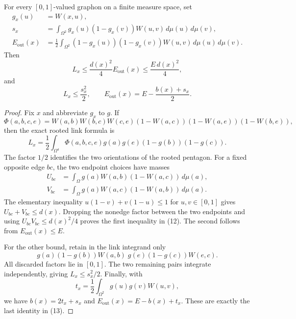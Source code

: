 \begin{lemma}\label{lem:universal-links}
For every \([0,1]\)-valued graphon on a finite measure space, set
\begin{align*}
 g_x(u)&=W(x,u),\\
 s_x&=\int_{\Omega^2}g_x(u)(1-g_x(v))W(u,v)\,d\mu(u)\,d\mu(v),\\
 E_{\mathrm{out}}(x)&=\frac12\int_{\Omega^2}
       (1-g_x(u))(1-g_x(v))W(u,v)\,d\mu(u)\,d\mu(v).
\end{align*}
Then
\begin{equation}
 L_x\le\frac{d(x)^2}{4}E_{\mathrm{out}}(x)
       \le\frac{E\,d(x)^2}{4},\tag{12}
\end{equation}
and
\begin{equation}
 L_x\le\frac{s_x^2}{2},\qquad
 E_{\mathrm{out}}(x)=E-\frac{b(x)+s_x}{2}.\tag{13}
\end{equation}
\end{lemma}
\begin{proof}
Fix \(x\) and abbreviate \(g_x\) to \(g\). If
\[
 \Phi(a,b,c,e)=W(a,b)W(b,c)W(c,e)
       (1-W(a,c))(1-W(a,e))(1-W(b,e)),
\]
then the exact rooted link formula is
\[
 L_x=\frac12\int_{\Omega^4}
       \Phi(a,b,c,e)g(a)g(e)(1-g(b))(1-g(c)).
\]
The factor \(1/2\) identifies the two orientations of the rooted pentagon.
For a fixed opposite edge \(bc\), the two endpoint choices have masses
\begin{align*}
 U_{bc}&=\int_\Omega g(a)W(a,b)(1-W(a,c))\,d\mu(a),\\
 V_{bc}&=\int_\Omega g(a)W(a,c)(1-W(a,b))\,d\mu(a).
\end{align*}
The elementary inequality \(u(1-v)+v(1-u)\le1\) for \(u,v\in[0,1]\)
gives \(U_{bc}+V_{bc}\le d(x)\). Dropping the nonedge factor between
the two endpoints and using \(U_{bc}V_{bc}\le d(x)^2/4\) proves the first
inequality in (12). The second follows from \(E_{\mathrm{out}}(x)\le E\).

For the other bound, retain in the link integrand only
\[
 g(a)(1-g(b))W(a,b)\;g(e)(1-g(c))W(e,c).
\]
All discarded factors lie in \([0,1]\). The two remaining pairs integrate
independently, giving \(L_x\le s_x^2/2\). Finally, with
\[
 t_x=\frac12\int_{\Omega^2}g(u)g(v)W(u,v),
\]
we have \(b(x)=2t_x+s_x\) and
\(E_{\mathrm{out}}(x)=E-b(x)+t_x\). These are exactly the last identity
in (13).
\end{proof}

